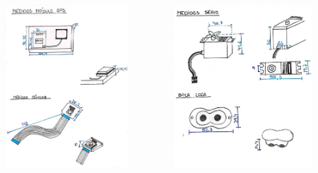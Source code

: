 \documentclass{beamer}
\begin{document}
\begin{frame}
\begin{columns}
\begin{column}{0.25\textwidth}
		\end{column}
		\begin{column}{0.25\textwidth}
			\centering
			\includegraphics[width=0.8\textwidth]{figs/planos3.jpeg} \\[5pt]
		\end{column}
		\begin{column}{0.25\textwidth}
			\centering
			\includegraphics[width=0.8\textwidth]{figs/planos4.jpeg} \\[5pt]
		\end{column}
	\end{columns}
\end{frame}
\end{document}
